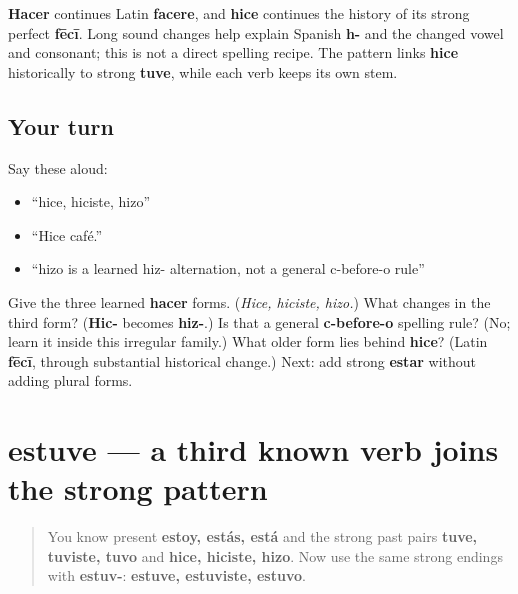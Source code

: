 \begin{cousinweb}
\textbf{Hacer} continues Latin \textbf{facere}, and \textbf{hice} continues the history of its strong perfect \textbf{fēcī}. Long sound changes help explain Spanish \textbf{h-} and the changed vowel and consonant; this is not a direct spelling recipe. The pattern links \textbf{hice} historically to strong \textbf{tuve}, while each verb keeps its own stem.
\end{cousinweb}

\subsection*{Your turn}
Say these aloud:

\begin{itemize}
\raggedright
  \item “hice, hiciste, hizo”
  \item “Hice café.”
  \item “hizo is a learned hiz- alternation, not a general c-before-o rule”
\end{itemize}

\begin{tcolorbox}[breakable,colback=teal!4,colframe=teal!35!black,title={Before you move on}]
Give the three learned \textbf{hacer} forms. (\emph{Hice, hiciste, hizo.}) What changes in the third form? (\textbf{Hic-} becomes \textbf{hiz-}.) Is that a general \textbf{c-before-o} spelling rule? (No; learn it inside this irregular family.) What older form lies behind \textbf{hice}? (Latin \textbf{fēcī}, through substantial historical change.) Next: add strong \textbf{estar} without adding plural forms.
\end{tcolorbox}
\section[estuve]{estuve — a third known verb joins the strong pattern}

\label{lesson:ES-C15-preterite-fuertes}



\begin{quote}
You know present \textbf{estoy, estás, está} and the strong past pairs \textbf{tuve, tuviste, tuvo} and \textbf{hice, hiciste, hizo}. Now use the same strong endings with \textbf{estuv-}: \textbf{estuve, estuviste, estuvo}.
\end{quote}

